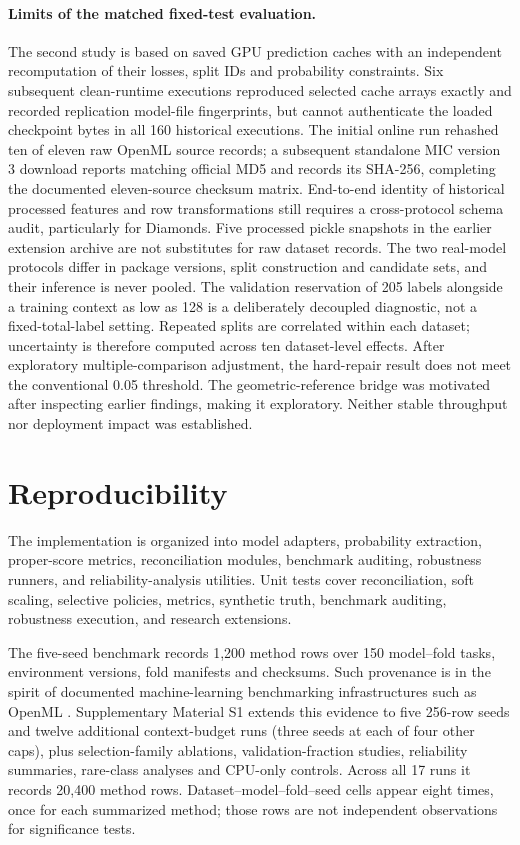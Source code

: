 \documentclass[a4paper,fleqn]{cas-sc}
\begin{document}
\paragraph{Limits of the matched fixed-test evaluation.}
The second study is based on saved GPU prediction caches with an independent recomputation of their losses, split IDs and probability constraints. Six subsequent clean-runtime executions reproduced selected cache arrays exactly and recorded replication model-file fingerprints, but cannot authenticate the loaded checkpoint bytes in all 160 historical executions. The initial online run rehashed ten of eleven raw OpenML source records; a subsequent standalone MIC version 3 download reports matching official MD5 and records its SHA-256, completing the documented eleven-source checksum matrix. End-to-end identity of historical processed features and row transformations still requires a cross-protocol schema audit, particularly for Diamonds. Five processed pickle snapshots in the earlier extension archive are not substitutes for raw dataset records. The two real-model protocols differ in package versions, split construction and candidate sets, and their inference is never pooled. The validation reservation of 205 labels alongside a training context as low as 128 is a deliberately decoupled diagnostic, not a fixed-total-label setting. Repeated splits are correlated within each dataset; uncertainty is therefore computed across ten dataset-level effects. After exploratory multiple-comparison adjustment, the hard-repair result does not meet the conventional 0.05 threshold. The geometric-reference bridge was motivated after inspecting earlier findings, making it exploratory. Neither stable throughput nor deployment impact was established.

\section{Reproducibility}
The implementation is organized into model adapters, probability extraction, proper-score metrics, reconciliation modules, benchmark auditing, robustness runners, and reliability-analysis utilities. Unit tests cover reconciliation, soft scaling, selective policies, metrics, synthetic truth, benchmark auditing, robustness execution, and research extensions.

The five-seed benchmark records 1,200 method rows over 150 model--fold tasks, environment versions, fold manifests and checksums. Such provenance is in the spirit of documented machine-learning benchmarking infrastructures such as OpenML \citep{vanschoren2014openml}. Supplementary Material S1 extends this evidence to five 256-row seeds and twelve additional context-budget runs (three seeds at each of four other caps), plus selection-family ablations, validation-fraction studies, reliability summaries, rare-class analyses and CPU-only controls. Across all 17 runs it records 20,400 method rows. Dataset--model--fold--seed cells appear eight times, once for each summarized method; those rows are not independent observations for significance tests.
\end{document}
